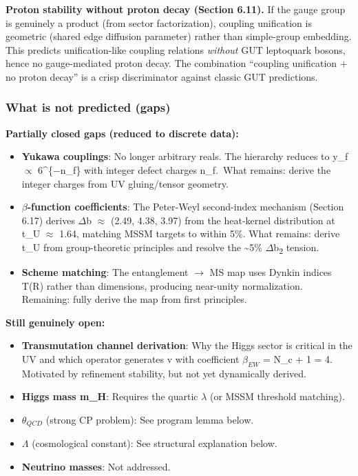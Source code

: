 \documentclass[11pt,a4paper]{article}
\theoremstyle{remark}
\providecommand{\tightlist}{%
  \setlength{\itemsep}{0pt}\setlength{\parskip}{0pt}}
\begin{document}
\textbf{Proton stability without proton decay (Section 6.11).} If the gauge group is genuinely a product (from sector factorization), coupling unification is geometric (shared edge diffusion parameter) rather than simple-group embedding. This predicts unification-like coupling relations \emph{without} GUT leptoquark bosons, hence no gauge-mediated proton decay. The combination ``coupling unification + no proton decay'' is a crisp discriminator against classic GUT predictions.

\subsubsection{What is not predicted (gaps)}\label{what-is-not-predicted-gaps}

\textbf{Partially closed gaps (reduced to discrete data):}

\begin{itemize}
\tightlist
\item
  \textbf{Yukawa couplings}: No longer arbitrary reals. The hierarchy reduces to
  y\_f \ensuremath{\propto} 6\^{}\{\ensuremath{-}n\_f\} with integer defect charges n\_f.~What remains: derive the
  integer charges from UV gluing/tensor geometry.
\item
  \textbf{\ensuremath{\beta}-function coefficients}: The Peter-Weyl second-index mechanism (Section 6.17)
  derives \ensuremath{\Delta}b \ensuremath{\approx} (2.49, 4.38, 3.97) from the heat-kernel distribution at t\_U \ensuremath{\approx} 1.64,
  matching MSSM targets to within 5\%. What remains: derive t\_U from group-theoretic
  principles and resolve the \textasciitilde5\% \ensuremath{\Delta}b\textsubscript{2} tension.
\item
  \textbf{Scheme matching}: The entanglement \ensuremath{\to} MS map uses Dynkin indices T(R) rather than dimensions, producing near-unity normalization. Remaining: fully derive the map from first principles.
\end{itemize}

\textbf{Still genuinely open:}

\begin{itemize}
\tightlist
\item
  \textbf{Transmutation channel derivation}: Why the Higgs sector is critical in
  the UV and which operator generates v with coefficient $\beta_{EW}$ = N\_c + 1 = 4.
  Motivated by refinement stability, but not yet dynamically derived.
\item
  \textbf{Higgs mass m\_H}: Requires the quartic \ensuremath{\lambda} (or MSSM threshold matching).
\item
  \textbf{$\theta_{QCD}$} (strong CP problem): See program lemma below.
\item
  \textbf{\ensuremath{\Lambda}} (cosmological constant): See structural explanation below.
\item
  \textbf{Neutrino masses}: Not addressed.
\end{itemize}
\end{document}
